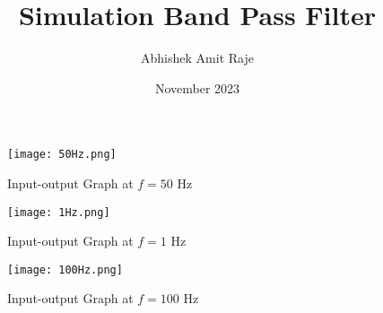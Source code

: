 \documentclass{article}
\title{Simulation Band Pass Filter}
\author{Abhishek Amit Raje}
\date{November 2023}
\begin{document}
\maketitle

\begin{figure}
    \centering
    \texttt{[image: 50Hz.png]}
    \caption{Input-output Graph at $f=50$ Hz}
    \label{fig:50Hz}
\end{figure}

\begin{figure}
    \centering
    \texttt{[image: 1Hz.png]}
    \caption{Input-output Graph at $f=1$ Hz}
    \label{fig:1Hz}
\end{figure}

\begin{figure}
    \centering
    \texttt{[image: 100Hz.png]}
    \caption{Input-output Graph at $f=100$ Hz}
    \label{fig:100Hz}
\end{figure}
\end{document}
